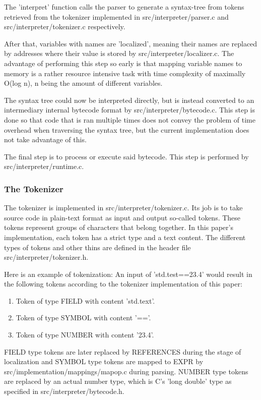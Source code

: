 \documentclass[12pt,a4paper,man]{apa7}
\begin{document}
The 'interpret' function calls the parser to generate a syntax-tree from tokens retrieved
from the tokenizer implemented in src/interpreter/parser.c and 
src/interpreter/tokenizer.c respectively.

After that, variables with names are 'localized', meaning their names are
replaced by addresses where their value is stored by src/interpreter/localizer.c.
The advantage of performing this step so early is that mapping variable names
to memory is a rather resource intensive task with time complexity of maximally 
O(log n), n being the amount of different variables.

The syntax tree could now be interpreted directly, but is instead converted
to an intermediary internal bytecode format by src/interpreter/bytecode.c.
This step is done so that code that is ran multiple times does not convey
the problem of time overhead when traversing the syntax tree, but the current
implementation does not take advantage of this.

The final step is to process or execute said bytecode. This step is performed
by src/interpreter/runtime.c.

\subsubsection{The Tokenizer}
The tokenizer is implemented in src/interpreter/tokenizer.c. Its job is to
take source code in plain-text format as input and output so-called tokens.
These tokens represent groups of characters that belong together. In this paper's
implementation, each token has a strict type and a text content.
The different types of tokens and other thins are defined in the header file
src/interpreter/tokenizer.h.

Here is an example of tokenization:
An input of 'std.test==23.4' would result in the following tokens according
to the tokenizer implementation of this paper:
\begin{enumerate}
    \item Token of type FIELD with content 'std.text'.
    \item Token of type SYMBOL with content '=='.
    \item Token of type NUMBER with content '23.4'.
\end{enumerate}
FIELD type tokens are later replaced by REFERENCES during the stage of localization
and SYMBOL type tokens are mapped to EXPR by src/implementation/mappings/mapop.c
during parsing. NUMBER type tokens are replaced by an actual number type, which
is C's 'long double' type as specified in src/interpreter/bytecode.h.
\end{document}
